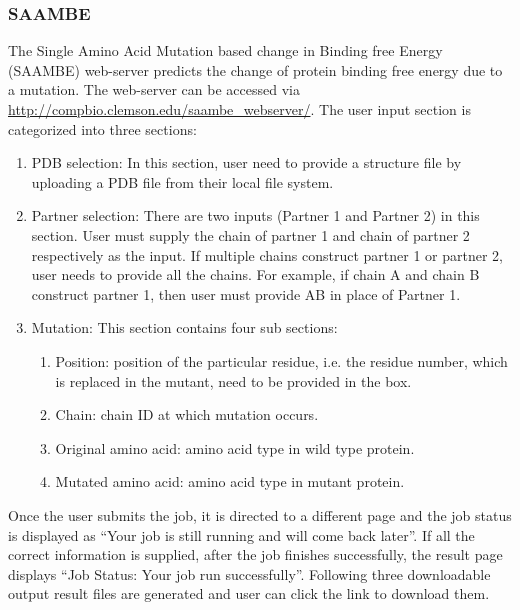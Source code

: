 \documentclass[9pt,tutorial]{livecoms}
\begin{document}
\subsubsection{SAAMBE}
The Single Amino Acid Mutation based change in Binding free Energy (SAAMBE)\cite{petukh2015predicting} web-server predicts the change of protein binding free energy due to a mutation. The web-server\cite{petukh2015predicting,petukh2016saambe} can be accessed via \url{http://compbio.clemson.edu/saambe_webserver/}. 
The user input section is categorized into three sections:
\begin{enumerate}
    \item PDB selection: In this section, user need to provide a structure file by uploading a PDB file from their local file system.
    
    \item Partner selection: There are two inputs (Partner 1 and Partner 2) in this section. User must supply the chain of partner 1 and chain of partner 2 respectively as the input. If multiple chains construct partner 1 or partner 2, user needs to provide all the chains. For example, if chain A and chain B construct partner 1, then user must provide AB in place of Partner 1.
    
    \item Mutation: This section contains four sub sections:
    \begin{enumerate}
	    \item Position: position of the particular residue, i.e. the residue number, which is replaced in the mutant, need to be provided in the box.
	    
	    \item Chain: chain ID at which mutation occurs.
	    
	    \item Original amino acid: amino acid type in wild type protein.
	    
	    \item Mutated amino acid: amino acid type in mutant protein.
    \end{enumerate}
\end{enumerate}
Once the user submits the job, it is directed to a different page and the job status is displayed as ``Your job is still running and will come back later''. If all the correct information is supplied, after the job finishes successfully, the result page displays “Job Status: Your job run successfully”. Following three downloadable output result files are generated and user can click the link to download them.
\end{document}
